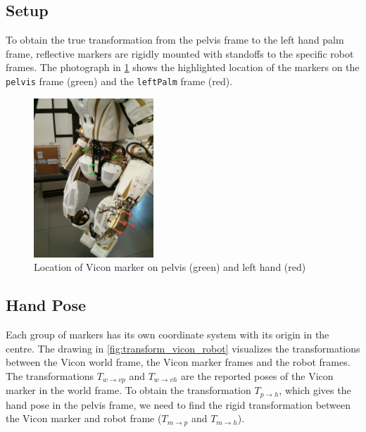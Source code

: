 \subsection{Setup}

To obtain the true transformation from the pelvis frame to the left hand palm frame, reflective markers are rigidly mounted with standoffs to the specific robot frames. The photograph in \cref{fig:vicon_marker} shows the highlighted location of the markers on the \texttt{pelvis} frame (green) and the \texttt{leftPalm} frame (red).

\begin{figure}[h]
\captionsetup{width=0.4\textwidth}
\centering
\includegraphics[width=0.4\textwidth]{images/vicon_pose/vicon_marker_col.jpg}
\caption[Location of Vicon marker]{Location of Vicon marker on pelvis (green) and left hand (red)}
\label{fig:vicon_marker}
\end{figure}


\subsection{Hand Pose}

Each group of markers has its own coordinate system with its origin in the centre.
The drawing in \cref{fig:transform_vicon_robot} visualizes the transformations between the Vicon world frame, the Vicon marker frames and the robot frames.
The transformations $T_{w \rightarrow vp}$ and $T_{w \rightarrow vh}$ are the reported poses of the Vicon marker in the world frame.
To obtain the transformation $T_{p \rightarrow h}$, which gives the hand pose in the pelvis frame, we need to find the rigid transformation between the Vicon marker and robot frame ($T_{m \rightarrow p}$ and $T_{m \rightarrow h}$).

